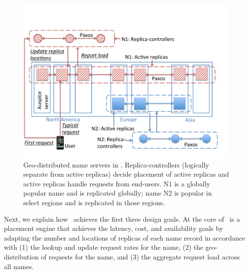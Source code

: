 \begin{figure}[t]
	\centering
	\vspace{-0.3in}
	\includegraphics[scale=0.33]{gns-dns/gnrs.pdf}
	\vspace{-0.35in}
	\caption{Geo-distributed name servers in \auspice.  Replica-controllers  (logically separate from active replicas) decide placement of active replicas and active replicas handle requests from end-users. N1 is a globally popular name and is replicated globally; name N2 is  popular in select regions and is replicated in those regions.}
	\vspace{-0.2in}
	\label{fig:auspice}
\end{figure}


Next, we explain how \auspice\ achieves the first three design goals. At the core of \auspice\ is a placement engine that achieves the latency, cost, and availability goals by adapting the number and locations of replicas of each name record in accordance with (1) the lookup and update request rates for the name, (2) the geo-distribution of requests for the name, and (3) the aggregate request load across all names. 




